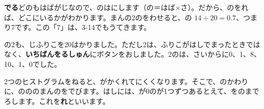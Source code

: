 \noindent\textbf{でる}\quad どのもはばがじなので、のはにします（の＝はば×さ）。だから、のをれば、どこにいるかがわかります。まんの2のをわせると、の $14\div20=0.7$、つまり7です。この「7」は、3-14でもうてきます。

の2も、じふりこを20はかりました。ただし2は、ふりこがはしでまったときではなく、\textbf{いちばんをるしゅん}にボタンをおしました。2のは、さいからに0、1、8、10、1、0でした。

2つのヒストグラムをねると、がかくれてにくくなります。そこで、のかわりに、のののまんのをでびます。はしには、が0のが1つずつあるとえて、をのまでろします。これを\textbf{れ}といいます。

